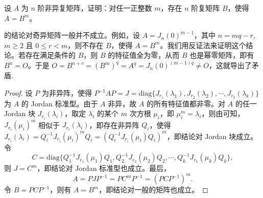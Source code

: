 \documentclass[../../main.tex]{subfiles}%
\begin{document}
\begin{theorem}[非异阵存在任意次的方根]\label{theorem:非奇异阵有任意方根}
设 $A$ 为 $n$ 阶非异复矩阵，证明：对任一正整数 $m$，存在 $n$ 阶复矩阵 $B$，使得 $A = B^m$。
\end{theorem}
\begin{remark}
的结论对奇异矩阵一般并不成立。例如，设 $A = J_n(0)^{m - 1}$，其中 $n = mq - r$, $m \geqslant  2$ 且 $0 \leqslant  r < m$，则不存在 $B$，使得 $A = B^m$。我们用反证法来证明这个结论。若存在满足条件的 $B$，则 $B$ 的特征值全为零，从而 $B$ 也是幂零矩阵，即有 $B^n = O$。于是 $O = B^{n + r} = (B^m)^q = A^q = J_n(0)^{(m - 1)q} \neq O$，这就导出了矛盾.
\end{remark}
\begin{proof}
设 $P$ 为非异阵，使得 $P^{-1}AP = J = \mathrm{diag}\{J_{r_1}(\lambda_1), J_{r_2}(\lambda_2), \cdots, J_{r_k}(\lambda_k)\}$ 为 $A$ 的 Jordan 标准型。由于 $A$ 非异，故 $A$ 的所有特征值都非零。对 $A$ 的任一 Jordan 块 $J_{r_i}(\lambda_i)$，取定 $\lambda_i$ 的某个 $m$ 次方根 $\mu_i$，即 $\mu_i^m = \lambda_i$，则由可知，$J_{r_i}(\mu_i)^m$ 相似于 $J_{r_i}(\lambda_i)$，即存在非异阵 $Q_i$，使得 $J_{r_i}(\lambda_i) = Q_i^{-1}J_{r_i}(\mu_i)^mQ_i = (Q_i^{-1}J_{r_i}(\mu_i)Q_i)^m$，即结论对 Jordan 块成立。令
\[C = \mathrm{diag}\{Q_1^{-1}J_{r_1}(\mu_1)Q_1, Q_2^{-1}J_{r_2}(\mu_2)Q_2, \cdots, Q_k^{-1}J_{r_k}(\mu_k)Q_k\},\]
则 $J = C^m$，即结论对 Jordan 标准型也成立。最后，
\[A = PJP^{-1} = PC^mP^{-1} = (PCP^{-1})^m.\]
令 $B = PCP^{-1}$，则有 $A = B^m$，即结论对一般的矩阵也成立。
\end{proof}
\end{document}

